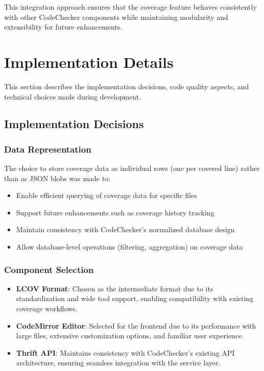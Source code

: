 This integration approach ensures that the coverage feature behaves consistently with other CodeChecker components while maintaining modularity and extensibility for future enhancements.

\section{Implementation Details}

This section describes the implementation decisions, code quality aspects, and technical choices made during development.

\subsection{Implementation Decisions}

\subsubsection{Data Representation}

The choice to store coverage data as individual rows (one per covered line) rather than as JSON blobs was made to:
\begin{itemize}
    \item Enable efficient querying of coverage data for specific files
    \item Support future enhancements such as coverage history tracking
    \item Maintain consistency with CodeChecker's normalized database design
    \item Allow database-level operations (filtering, aggregation) on coverage data
\end{itemize}

\subsubsection{Component Selection}

\begin{itemize}
    \item \textbf{LCOV Format}: Chosen as the intermediate format due to its standardization and wide tool support, enabling compatibility with existing coverage workflows.
    
    \item \textbf{CodeMirror Editor}: Selected for the frontend due to its performance with large files, extensive customization options, and familiar user experience.
    
    \item \textbf{Thrift API}: Maintains consistency with CodeChecker's existing API architecture, ensuring seamless integration with the service layer.
\end{itemize}

